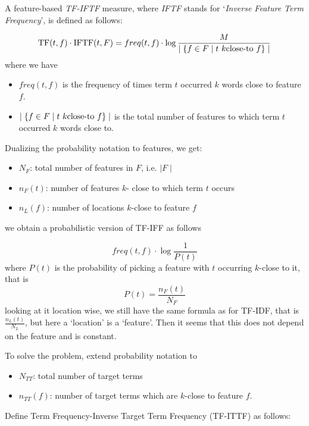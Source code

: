 \begin{definition}
A feature-based  \emph{TF-IFTF}  measure, where \emph{IFTF} stands for `\emph{Inverse Feature Term Frequency}', is defined as follows:

\begin{equation}
\label{tf-iftf}
\textmd{TF}(t,f) \cdot \textmd{IFTF}(t, F) = freq(t, f) \cdot \log{{M} \over {\mid \{f \in F \mid t  \ k\textmd{close-to} \ f \} \mid}}
\end{equation}
where we have
\begin{itemize}
\item $freq(t, f)$ is the frequency of times term $t$ occurred $k$ words close to feature $f$.
\item $\mid \{f \in F \mid t  \ k\textmd{close-to} \ f \} \mid$ is the total number of features to which term $t$ occurred $k$ words close to. 
\end{itemize}

\end{definition}


Dualizing the  probability notation to  features, we get:

\begin{itemize}
\item $N_F$: total number of features in $F$, i.e. $\mid F \mid$
\item  $n_F (t)$: number of features $k$- close to which term $t$ occurs
\item  $n_L(f)$: number of locations $k$-close to feature $f$
\end{itemize}

we obtain a probabilistic version of TF-IFF as follows

\[
freq(t,f) \cdot \log{\frac{1}{P(t)}}
\]
where   $P(t)$ is the probability of picking a feature with $t$ occurring $k$-close to it, that is
\[
P(t) = \frac{n_F(t)}{N_F}
\]
looking at it location wise, we still have the same formula as for TF-IDF, that is $\frac{n_L(t)}{N_L}$, but here a `location'  is a `feature'.  Then it seems that this does not depend on the feature and is constant. 

To solve the problem,  extend probability notation to
\begin{itemize}
\item $N_{TT}$: total number of target terms
\item  $n_{TT}(f)$: number of target terms which are $k$-close to feature $f$.
\end{itemize}

Define Term Frequency-Inverse Target Term Frequency (TF-ITTF) as follows:

